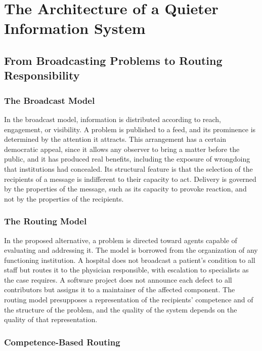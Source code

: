 \documentclass[11pt]{report}
\theoremstyle{definition}
\theoremstyle{remark}
\begin{document}
\part{The Architecture of a Quieter Information System}

\chapter{From Broadcasting Problems to Routing Responsibility}

\section{The Broadcast Model}

In the broadcast model, information is distributed according to reach, engagement, or visibility. A problem is published to a feed, and its prominence is determined by the attention it attracts. This arrangement has a certain democratic appeal, since it allows any observer to bring a matter before the public, and it has produced real benefits, including the exposure of wrongdoing that institutions had concealed. Its structural feature is that the selection of the recipients of a message is indifferent to their capacity to act. Delivery is governed by the properties of the message, such as its capacity to provoke reaction, and not by the properties of the recipients.

\section{The Routing Model}

In the proposed alternative, a problem is directed toward agents capable of evaluating and addressing it. The model is borrowed from the organization of any functioning institution. A hospital does not broadcast a patient's condition to all staff but routes it to the physician responsible, with escalation to specialists as the case requires. A software project does not announce each defect to all contributors but assigns it to a maintainer of the affected component. The routing model presupposes a representation of the recipients' competence and of the structure of the problem, and the quality of the system depends on the quality of that representation.

\section{Competence-Based Routing}
\end{document}
